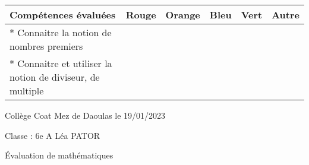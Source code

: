 \documentclass[a4paper,12pt,fleqn]{article}
\begin{document}
\begin{footnotesize}

\begin{center}

\begin{tabular}{|p{120mm}|p{8mm}|p{10mm}|p{8mm}|p{8mm}|p{8mm}|}

\hline
\textbf{Compétences évaluées} & \textbf{Rouge} & \textbf{Orange} & \textbf{Bleu} & \textbf{Vert} & \textbf{Autre} \\
\hline


*  Connaitre la notion de nombres premiers  & & & & & \\ 
\hline
*  Connaitre et utiliser la notion de diviseur, de multiple  & & & & & \\ 
\hline
\end{tabular}
\end{center}
\end{footnotesize}
 \par 
\medskip
 \par 
\medskip
\newpage
\setcounter{exo}{0}


Collège Coat Mez de Daoulas  \hfill  le 19/01/2023

Classe : 6e A \hfill Léa PATOR

\begin{center}
\begin{LARGE} Évaluation de mathématiques \end{LARGE}
\end{center}

\end{document}
